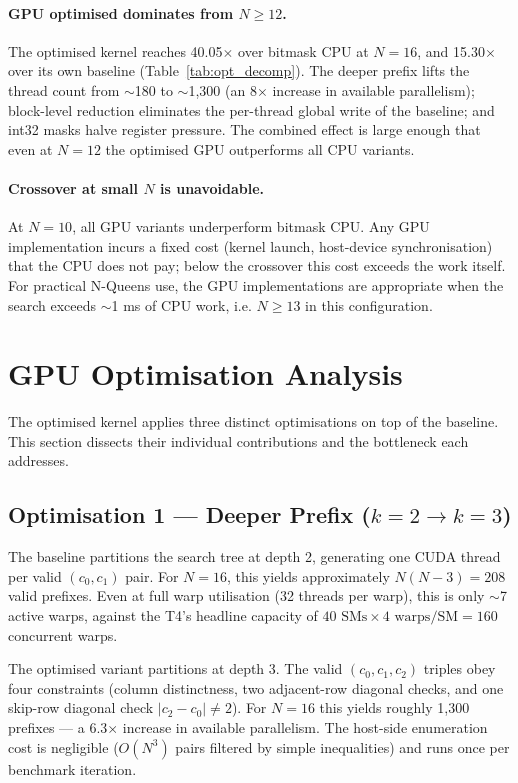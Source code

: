 \documentclass[12pt, letterpaper]{article}
\begin{document}
\paragraph{GPU optimised dominates from $N \geq 12$.}
The optimised kernel reaches 40.05$\times$ over bitmask CPU at $N = 16$, and 15.30$\times$ over its own baseline (Table~\ref{tab:opt_decomp}). The deeper prefix lifts the thread count from $\sim$180 to $\sim$1{,}300 (an 8$\times$ increase in available parallelism); block-level reduction eliminates the per-thread global write of the baseline; and int32 masks halve register pressure. The combined effect is large enough that even at $N = 12$ the optimised GPU outperforms all CPU variants.

\paragraph{Crossover at small $N$ is unavoidable.}
At $N = 10$, all GPU variants underperform bitmask CPU. Any GPU implementation incurs a fixed cost (kernel launch, host-device synchronisation) that the CPU does not pay; below the crossover this cost exceeds the work itself. For practical N-Queens use, the GPU implementations are appropriate when the search exceeds $\sim$1 ms of CPU work, i.e. $N \geq 13$ in this configuration.

\section{GPU Optimisation Analysis}
\label{sec:gpu_opt_analysis}

The optimised kernel applies three distinct optimisations on top of the baseline. This section dissects their individual contributions and the bottleneck each addresses.

\subsection{Optimisation 1 --- Deeper Prefix ($k=2 \to k=3$)}

The baseline partitions the search tree at depth 2, generating one CUDA thread per valid $(c_0, c_1)$ pair. For $N = 16$, this yields approximately $N(N-3) = 208$ valid prefixes. Even at full warp utilisation (32 threads per warp), this is only $\sim$7 active warps, against the T4's headline capacity of $40 \text{ SMs} \times 4 \text{ warps/SM} = 160$ concurrent warps.

The optimised variant partitions at depth 3. The valid $(c_0, c_1, c_2)$ triples obey four constraints (column distinctness, two adjacent-row diagonal checks, and one skip-row diagonal check $|c_2 - c_0| \neq 2$). For $N = 16$ this yields roughly 1{,}300 prefixes --- a 6.3$\times$ increase in available parallelism. The host-side enumeration cost is negligible ($O(N^3)$ pairs filtered by simple inequalities) and runs once per benchmark iteration.
\end{document}
